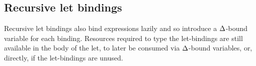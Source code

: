 \documentclass[acmsmall,review,screen]{acmart}
\begin{document}
\subsection{Recursive let bindings}\label{sec:recursivelets}

%
Recursive let bindings also bind expressions lazily and so
introduce a $\Delta$-bound variable for each binding. Resources required to type the
let-bindings are still available in the body of the let, to later be consumed
via $\Delta$-bound variables, or, directly, if the let-bindings are unused.
%

%
%
%
%
\end{document}
